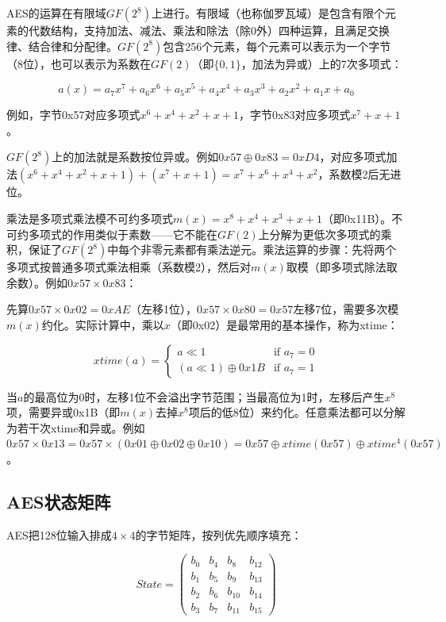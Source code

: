 AES的运算在有限域$GF(2^8)$上进行。有限域（也称伽罗瓦域）是包含有限个元素的代数结构，支持加法、减法、乘法和除法（除0外）四种运算，且满足交换律、结合律和分配律。$GF(2^8)$包含256个元素，每个元素可以表示为一个字节（8位），也可以表示为系数在$GF(2)$（即$\{0,1\}$，加法为异或）上的7次多项式：

\begin{equation}
a(x) = a_7x^7 + a_6x^6 + a_5x^5 + a_4x^4 + a_3x^3 + a_2x^2 + a_1x + a_0
\end{equation}

例如，字节0x57对应多项式$x^6 + x^4 + x^2 + x + 1$，字节0x83对应多项式$x^7 + x + 1$。

$GF(2^8)$上的加法就是系数按位异或。例如$0x57 \oplus 0x83 = 0xD4$，对应多项式加法$(x^6 + x^4 + x^2 + x + 1) + (x^7 + x + 1) = x^7 + x^6 + x^4 + x^2$，系数模2后无进位。

乘法是多项式乘法模不可约多项式$m(x) = x^8 + x^4 + x^3 + x + 1$（即0x11B）。不可约多项式的作用类似于素数——它不能在$GF(2)$上分解为更低次多项式的乘积，保证了$GF(2^8)$中每个非零元素都有乘法逆元。乘法运算的步骤：先将两个多项式按普通多项式乘法相乘（系数模2），然后对$m(x)$取模（即多项式除法取余数）。例如$0x57 \times 0x83$：

先算$0x57 \times 0x02 = 0xAE$（左移1位），$0x57 \times 0x80 = 0x57$左移7位，需要多次模$m(x)$约化。实际计算中，乘以$x$（即0x02）是最常用的基本操作，称为xtime：

\begin{equation}
xtime(a) = \begin{cases} a \ll 1 & \text{if } a_7 = 0 \\ (a \ll 1) \oplus 0x1B & \text{if } a_7 = 1 \end{cases}
\end{equation}

当$a$的最高位为0时，左移1位不会溢出字节范围；当最高位为1时，左移后产生$x^8$项，需要异或0x1B（即$m(x)$去掉$x^8$项后的低8位）来约化。任意乘法都可以分解为若干次xtime和异或。例如$0x57 \times 0x13 = 0x57 \times (0x01 \oplus 0x02 \oplus 0x10) = 0x57 \oplus xtime(0x57) \oplus xtime^4(0x57)$。

\subsection{AES状态矩阵}

AES把128位输入排成$4 \times 4$的字节矩阵，按列优先顺序填充：

\begin{equation}
State = \begin{pmatrix} b_0 & b_4 & b_8 & b_{12} \\ b_1 & b_5 & b_9 & b_{13} \\ b_2 & b_6 & b_{10} & b_{14} \\ b_3 & b_7 & b_{11} & b_{15} \end{pmatrix}
\end{equation}

